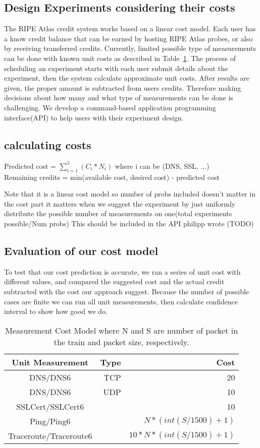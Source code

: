 \subsection{Design Experiments considering their costs}

The RIPE Atlas credit system works based on a linear cost model. Each user has a know credit balance that can be earned by hosting RIPE Atlas probes, or also by receiving transferred credits. Currently, limited possible type of measurements can be done with known unit costs as described in Table~\ref{tab:cost}. The process of scheduling an experiment starts with each user submit details about the experiment, then the system calculate approximate unit costs. After results are given, the proper amount is subtracted from users credits. Therefore making decisions about how many and what type of measurements can be done is challenging. We develop a command-based application programming interface(API) to help users with their experiment design. 

\subsection{calculating costs}

Predicted cost = $\sum_{i=1}^{5} (C_i * N_i)$  where i can be (DNS, SSL, ...)\\
Remaining credits = min(available cost, desired cost) - predicted cost

Note that it is a linear cost model so number of probs included doesn't matter in the cost part it matters when we suggest the experiment by just uniformly distribute the possible number of measurements on one(total experiments possible/Num probs)
This should be included in the API philipp wrote (TODO)

\subsection{Evaluation of our cost model}
To test that our cost prediction is accurate, we ran a series of unit cost with different values, and compared  the suggested cost and the actual credit subtracted with the cost our approach suggest. Because the number of possible cases are finite we can run all unit measurements, then calculate confidence interval to show how good we do.
\begin{table}[h] 

\hspace{2in}
\centering 
\begin{tabular}{c rr} 
\hline\hline 
Unit Measurement& Type & Cost \\ [0.5ex] 
\hline 
DNS\slash DNS6 & TCP & 20\\ 
DNS\slash DNS6 & UDP & 10\\ 
SSLCert\slash SSLCert6 & & 10 \\
Ping\slash Ping6 & & $N * (int(S/1500)+1)$\\
Traceroute\slash Traceroute6 & & $ 10*N*(int(S/1500)+1)$\\[1ex] 
\hline 
\end{tabular} 
\caption{Measurement Cost Model where N and S are number of packet in the train and packet size, respectively.} 
\label{tab:cost} 
\end{table} 
